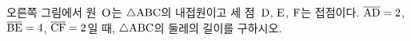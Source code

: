\noindent\begin{minipage}[t]{0.58\linewidth}\vspace{0pt}\raggedright 오른쪽 그림에서 원~$\mathrm{O}$는 $\triangle\mathrm{ABC}$의 내접원이고 세 점~$\mathrm{D}$, $\mathrm{E}$, $\mathrm{F}$는 접점이다. $\overline{\mathrm{AD}}=2$, $\overline{\mathrm{BE}}=4$, $\overline{\mathrm{CF}}=2$일 때, $\triangle\mathrm{ABC}$의 둘레의 길이를 구하시오.\end{minipage}\hfill\begin{minipage}[t]{0.4\linewidth}\vspace{0pt}\centering \resizebox{\ifdim\width>\linewidth\linewidth\else\width\fi}{!}{}\end{minipage}\par
